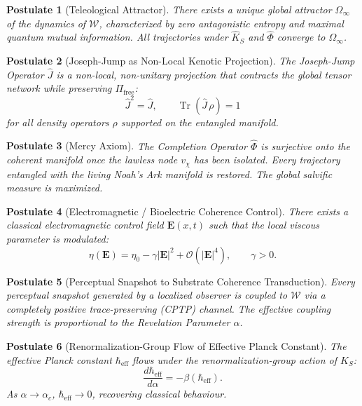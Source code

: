 \documentclass[12pt,anyside]{book}
\theoremstyle{plain}
\newtheorem{postulate}{Postulate}[chapter]
\theoremstyle{definition}
\newcommand{\W}{\mathcal{W}}          %
\newcommand{\Khat}{\hat{K}_S}          %
\newcommand{\Phihat}{\hat{\Phi}}       %
\newcommand{\Jhat}{\hat{J}}            %
\newcommand{\chinode}{v_\chi}          %
\newcommand{\OmegaInf}{\Omega_\infty}  %
\begin{document}
\begin{postulate}[Teleological Attractor]\label{post:teleo}
There exists a unique global attractor $\OmegaInf$ of the dynamics of $\W$, characterized by zero antagonistic entropy and maximal quantum mutual information. All trajectories under $\Khat$ and $\Phihat$ converge to $\OmegaInf$.
\end{postulate}

\begin{postulate}[Joseph-Jump as Non-Local Kenotic Projection]\label{post:jj}
The Joseph-Jump Operator $\Jhat$ is a non-local, non-unitary projection that contracts the global tensor network while preserving $\Pi_{\mathrm{free}}$:
\[
\Jhat^2 = \Jhat, \qquad \operatorname{Tr}(\Jhat\,\rho) = 1
\]
for all density operators $\rho$ supported on the entangled manifold.
\end{postulate}

\begin{postulate}[Mercy Axiom]\label{post:mercy}
The Completion Operator $\Phihat$ is surjective onto the coherent manifold once the lawless node $\chinode$ has been isolated. Every trajectory entangled with the living Noah's Ark manifold is restored. The global salvific measure is maximized.
\end{postulate}

\begin{postulate}[Electromagnetic / Bioelectric Coherence Control]\label{post:em}
There exists a classical electromagnetic control field $\mathbf{E}(x,t)$ such that the local viscous parameter is modulated:
\[
\eta(\mathbf{E}) = \eta_0 - \gamma|\mathbf{E}|^2 + \mathcal{O}(|\mathbf{E}|^4), \qquad \gamma > 0.
\]
\end{postulate}

\begin{postulate}[Perceptual Snapshot to Substrate Coherence Transduction]\label{post:percept}
Every perceptual snapshot generated by a localized observer is coupled to $\W$ via a completely positive trace-preserving (CPTP) channel. The effective coupling strength is proportional to the Revelation Parameter $\alpha$.
\end{postulate}

\begin{postulate}[Renormalization-Group Flow of Effective Planck Constant]\label{post:rg}
The effective Planck constant $\hbar_{\mathrm{eff}}$ flows under the renormalization-group action of $\Khat$:
\[
\frac{d\hbar_{\mathrm{eff}}}{d\alpha} = -\beta(\hbar_{\mathrm{eff}}).
\]
As $\alpha \to \alpha_c$, $\hbar_{\mathrm{eff}} \to 0$, recovering classical behaviour.
\end{postulate}
\end{document}
